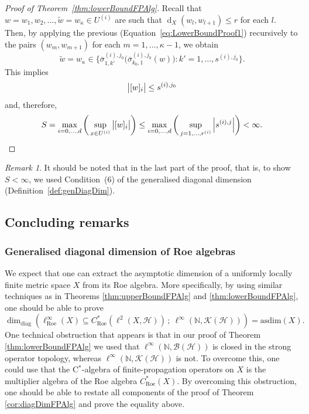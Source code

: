 \documentclass[a4paper]{amsart}
\newcommand{\myhyp}{\textnormal{-}\hskip0pt\relax}
\numberwithin{equation}{section}
\newcommand{\N}{\mathbb{N}}
\newcommand{\Bcal}{\mathcal{B}}
\newcommand{\Hcal}{\mathcal{H}}
\newcommand{\Kcal}{\mathcal{K}}
\newcommand{\cstar}{C$^\ast$\myhyp{}algebra}
\newcommand{\bop}[1]{\Bcal({#1})}
\newcommand{\kop}[1]{\Kcal({#1})}
\newcommand{\Croe}[1]{C^{\ast}_{\mathrm{Roe}}(#1)}
\newcommand{\CroeCartan}[1]{\ell^{\infty}_{\mathrm{Roe}}({#1})}
\newcommand{\prn}[1]{{(#1)}}
\DeclareMathOperator{\dist}{d}
\newcommand{\abs}[1]{{\left\lvert #1 \right \rvert}}
\newcommand{\distX}[2]{{\dist_X ( #1, #2 )}}
\newcommand{\ddimn}[3]{\dim_{\mathrm{diag}}({#1}\subseteq{#2}\, ;~{#3})}
\newcommand{\asdim}[1]{\mathrm{asdim}({#1})}
\theoremstyle{plain}
\theoremstyle{indented}
\numberwithin{equation}{section}
\theoremstyle{definition}
\theoremstyle{remark}
\newtheorem{rmk}[thm]{Remark}
\theoremstyle{plain}
\theoremstyle{definition}
\begin{document}
\begin{proof}[Proof of Theorem~\ref{thm:lowerBoundFPAlg}]
    Recall that ${w = w_1, w_2, \hdots, \widetilde{w}=w_\kappa \in U^{\prn{i}}}$ are such that ${\distX{w_l}{w_{l+1}} \le r}$ for each ${l}$. 
    Then, by applying the previous (Equation~\eqref{eq:LowerBoundProof1}) recursively to the pairs ${(w_{m}, w_{m+1})}$ for each ${m=1,\hdots,\kappa-1}$, 
    we obtain 
    \begin{equation*}
        \widetilde{w} = w_\kappa \in \Big\{{{\overline{\sigma}}_{1,k'}^{(i),j_0}}\big({\overline{\sigma}}_{k_0,1}^{(i),j_0}(w) \big) \colon k' = 1,\hdots,s^{(i),j_0}  \Big\}.
    \end{equation*}
    This implies 
        \[ \big{\lvert}{ [ w ]_{i}} \big{\rvert}  \le s^{(i),j_0} \]
        and, therefore,
        \begin{equation*}
            S = \max_{i=0,\hdots,d} \bigg(\sup_{x \in U^{(i)}} \big{\lvert}{ [ w ]_{i}} \big{\rvert} \bigg) \le \max_{ i=0,\hdots,d  } \bigg(\sup_{j=1,\hdots,r^{(i)}} \abs{ s^{(i),j} }\bigg)  < \infty . \qedhere
        \end{equation*}
\end{proof}

\begin{rmk}
It should be noted that in the last part of the proof, that is, to show ${S<\infty}$,
we used Condition~(6) of the generalised diagonal dimension
(Definition~\ref{def:genDiagDim}).
\end{rmk}


\medskip
\subsection{Concluding remarks}

\subsubsection{Generalised diagonal dimension of Roe algebras}

We expect that one can extract the asymptotic dimension of a uniformly locally finite metric space $X$ from its Roe algebra. 
More specifically, 
by using similar techniques as in Theorems \ref{thm:upperBoundFPAlg} and \ref{thm:lowerBoundFPAlg},
one should be able to prove
\begin{equation*}
         \ddimn{\CroeCartan{X}}{\Croe{\ell^2(X, \Hcal)}}{\ell^\infty(\N, \kop{\Hcal})} = \asdim{X}.
\end{equation*}
One technical obstruction that appears
is that in our proof of Theorem \ref{thm:lowerBoundFPAlg}
we used that ${\ell^\infty(\N, \bop{\Hcal})}$ is closed in the strong operator topology,
whereas ${\ell^\infty(\N, \kop{\Hcal})}$ is not.
To overcome this, one could use that
the \cstar{} of finite\myhyp{}propagation operators on $X$
is the multiplier algebra of the Roe algebra ${\Croe{X}}$.
By overcoming this obstruction, one should be able to restate all components of the proof of Theorem \ref{cor:diagDimFPAlg} and prove the equality above.
\end{document}
